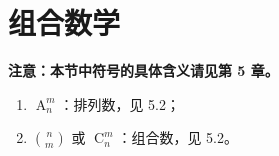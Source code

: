 \section{组合数学}

\textbf{注意：本节中符号的具体含义请见第 5 章。}

\begin{enumerate}
\item $\operatorname{A}_n^m$：排列数，见 5.2；
\item $\binom{n}{m}$ 或 $\operatorname{C}_n^m$：组合数，见 5.2。
\end{enumerate}